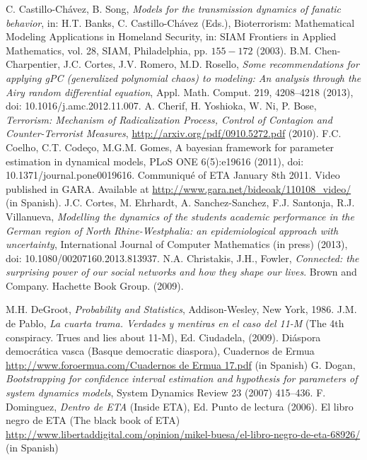 \documentclass[12pt,a4paper]{report}
\begin{document}
\begin{thebibliography}{99}
 C. Castillo-Ch\'{a}vez, B. Song, \textit{Models for the transmission dynamics of fanatic behavior}, in: H.T. Banks, C. Castillo-Ch\'{a}vez (Eds.), Bioterrorism: Mathematical Modeling Applications in Homeland Security, in: SIAM Frontiers in Applied Mathematics, vol. 28, SIAM, Philadelphia, pp. $155-172$ (2003).
 B.M. Chen-Charpentier, J.C. Cortes, J.V. Romero, M.D. Rosello, \textit{Some recommendations for applying gPC (generalized polynomial chaos) to modeling: An analysis through the Airy random differential equation}, Appl. Math. Comput. 219, 4208--4218 (2013), doi: 10.1016/j.amc.2012.11.007.
 A. Cherif, H. Yoshioka, W. Ni, P. Bose, \textit{Terrorism: Mechanism of Radicalization Process, Control of Contagion and Counter-Terrorist Measures}, \url{http://arxiv.org/pdf/0910.5272.pdf} (2010).
 F.C. Coelho, C.T. Code\c{c}o, M.G.M. Gomes, A bayesian framework for parameter estimation in dynamical models, PLoS ONE 6(5):e19616 (2011), doi: 10.1371/journal.pone0019616.
 Communiqu\'e of ETA January 8th 2011. Video published in GARA. Available at \url{http://www.gara.net/bideoak/110108_video/} (in Spanish).
  J.C. Cortes, M. Ehrhardt, A. Sanchez-Sanchez, F.J. Santonja, R.J. Villanueva, \textit{Modelling the dynamics of the students academic performance in the German region of North Rhine-Westphalia: an epidemiological approach with uncertainty}, International Journal of Computer Mathematics (in press) (2013), doi: 10.1080/00207160.2013.813937.
 N.A. Christakis, J.H., Fowler, \textit{Connected: the surprising power of our social networks and how they shape our lives}. Brown and Company. Hachette Book Group. (2009).

 M.H. DeGroot, \textit{Probability and Statistics}, Addison-Wesley, New York, 1986.
 J.M. de Pablo, \textit{La cuarta trama. Verdades y mentiras en el caso del 11-M} (The 4th conspiracy. Trues and lies about 11-M), Ed. Ciudadela, (2009).
 Di\'aspora democr\'atica vasca (Basque democratic diaspora), Cuadernos de Ermua \url{http://www.foroermua.com/Cuadernos de Ermua 17.pdf} (in Spanish) 
 G. Dogan, \textit{Bootstrapping for confidence interval estimation and hypothesis for parameters of system dynamics models}, System Dynamics Review 23 (2007) 415--436.
 F. Dominguez, \textit{Dentro de ETA} (Inside ETA), Ed. Punto de lectura (2006).
 El libro negro de ETA (The black book of ETA) \url{http://www.libertaddigital.com/opinion/mikel-buesa/el-libro-negro-de-eta-68926/} (in Spanish)


\end{thebibliography}
\end{document}

